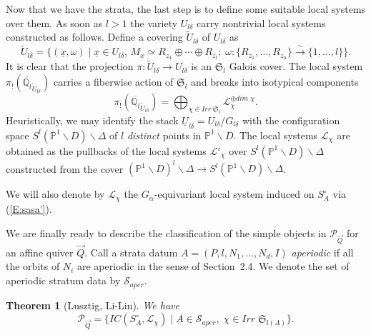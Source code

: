 \documentclass[a4paper,10pt]{amsart}
\def\a{\alpha}
\def\qlb{\overline{\mathbb{Q}_l}}
\def\ux{\underline{x}}
\newtheorem{theo}{\bf{Theorem}}[section]
\numberwithin{equation}{section}
\begin{document}
Now that we have the strata, the last step is to define some suitable local systems over them.
As soon as $l >1$ the variety $U_{l\delta}$ carry nontrivial local systems constructed as follows. Define a covering $\widetilde{U}_{l\delta}$ of $U_{l\delta}$ as
$$\widetilde{U}_{l\delta}=\big\{ (\ux, \omega)\;|\; \ux \in U_{l\delta}, \,M_{\ux} \simeq R_{z_1} \oplus \cdots \oplus R_{z_l}; \;\omega: \{ R_{z_1}, \ldots, R_{z_n}\} \stackrel{\sim}{\to} \{1, \ldots, l\}\big\}.$$
It is clear that the projection $\pi: \widetilde{U}_{l\delta} \to U_{l\delta}$ is an $\mathfrak{S}_l$ Galois cover. The local system $\pi_!(\qlb_{\widetilde{U}_{l\delta}})$ carries a fiberwise action of $\mathfrak{S}_l$ and breaks into isotypical components
\begin{equation}\label{E:2loc}
\pi_!(\qlb_{\widetilde{U}_{l\delta}}) = \bigoplus_{\chi \in Irr\;\mathfrak{S}_l} \mathcal{L}_{\chi}^{\oplus dim\;\chi}.
\end{equation}
Heuristically, we may identify the stack $\underline{U}_{l\delta}=U_{l\delta}/G_{l\delta}$ with the configuration space $S^l(\mathbb{P}^1 \backslash D)\backslash \Delta$ of $l$ \textit{distinct} points in $\mathbb{P}^1 \backslash D$. The local systems $\mathcal{L}_{\chi}$ are obtained as the pullbacks of the local systems $\mathcal{L}'_{\chi}$ over $S^l(\mathbb{P}^1 \backslash D)\backslash \Delta$ constructed from the cover
$(\mathbb{P}^1 \backslash D)^l\backslash \Delta \to S^l(\mathbb{P}^1 \backslash D)\backslash \Delta$.

We will also denote by $\mathcal{L}_{\chi}$ the $G_{\a}$-equivariant local system induced on $S^{\circ}_{\underline{A}}$ via (\ref{E:sasa'}).

\vspace{.1in}

We are finally ready to describe the classification of the simple objects in $\mathcal{P}_{\vec{Q}}$ for an affine quiver $\vec{Q}$. Call a strata datum $\underline{A}=(P,l,N_1, \ldots, N_d, I)$ \textit{aperiodic} if all the orbits of $N_i$ are aperiodic in the sense of Section~2.4. We denote the set of aperiodic stratum data by $\mathcal{S}_{aper}$.

\vspace{.1in}

\begin{theo}[Lusztig, Li-Lin] We have
$$\mathcal{P}_{\vec{Q}}=\big\{IC(S^{\circ}_{\underline{A}},\mathcal{L}_{\chi})\;|\; \underline{A} \in \mathcal{S}_{aper},\; \chi \in Irr\;\mathfrak{S}_{l(\underline{A})}\big\}.$$
\end{theo}
\end{document}
